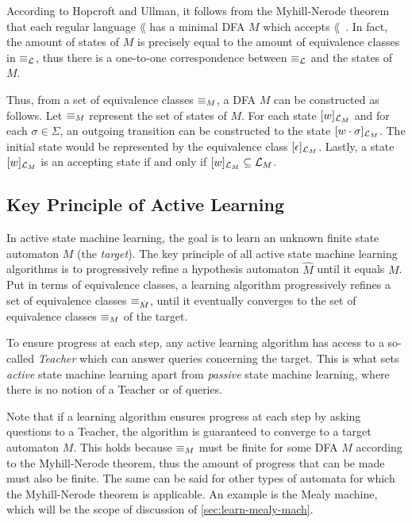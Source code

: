 According to Hopcroft and Ullman, it follows from the Myhill-Nerode theorem that
each regular language $\lang$ has a minimal DFA $M$ which accepts
$\lang$~\cite{Hopcroft2001}. In fact, the amount of states of $M$ is precisely
equal to the amount of equivalence classes in $\equiv_{\mathcal{L}}$, thus there is a
one-to-one correspondence between $\equiv_{\mathcal{L}}$ and the states of $M$.

Thus, from a set of equivalence classes $\equiv_M$, a DFA $M$ can be constructed
as follows. Let $\equiv_M$ represent the set of states of $M$. For each state
$[w]_{\mathcal{L}_M}$ and for each $\sigma \in \Sigma$, an outgoing transition
can be constructed to the state $[w\cdot\sigma]_{\mathcal{L}_M}$. The initial
state would be represented by the equivalence class
$[\epsilon]_{\mathcal{L}_M}$. Lastly, a state $[w]_{\mathcal{L}_M}$ is an
accepting state if and only if $[w]_{\mathcal{L}_M} \subseteq \mathcal{L}_M$.

\subsection{Key Principle of Active Learning}
\label{sec:key-principle-active}
In active state machine learning, the goal is to learn an unknown finite state
automaton $M$ (the \textit{target}). The key principle of all active state
machine learning algorithms is to progressively refine a hypothesis automaton
$\hat M$ until it equals $M$. Put in terms of equivalence classes, a learning
algorithm progressively refines a set of equivalence classes $\equiv_{\hat M}$,
until it eventually converges to the set of equivalence classes $\equiv_M$ of the
target.

To ensure progress at each step, any active learning algorithm has access to a
so-called \textit{Teacher} which can answer queries concerning the target. This
is what sets \textit{active} state machine learning apart from \textit{passive}
state machine learning, where there is no notion of a Teacher or of queries.

Note that if a learning algorithm ensures progress at each step by asking
questions to a Teacher, the algorithm is guaranteed to converge to a target
automaton $M$. This holds because $\equiv_M$ must be finite for some DFA $M$
according to the Myhill-Nerode theorem, thus the amount of progress that can be
made must also be finite. The same can be said for other types of automata for
which the Myhill-Nerode theorem is applicable. An example is the Mealy machine,
which will be the scope of discussion of \cref{sec:learn-mealy-mach}.

